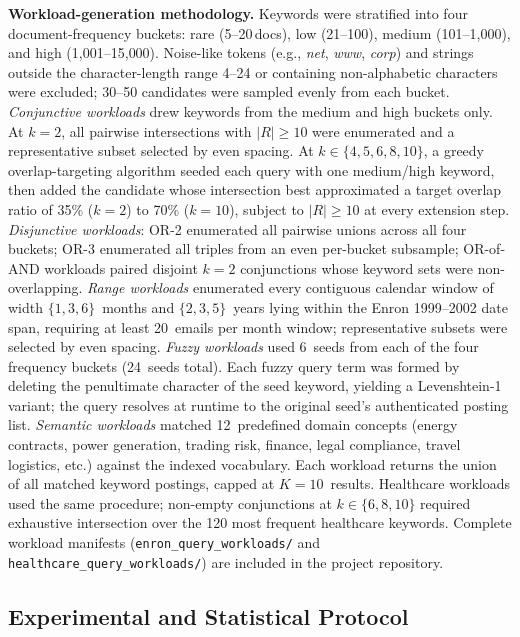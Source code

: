 \documentclass[journal]{IEEEtran}
\theoremstyle{tight}
\theoremstyle{remark}
\theoremstyle{plain}
\begin{document}
\textbf{Workload-generation methodology.}
Keywords were stratified into four document-frequency buckets: rare (5--20\,docs), low (21--100), medium (101--1{,}000), and high (1{,}001--15{,}000). Noise-like tokens (e.g., \textit{net}, \textit{www}, \textit{corp}) and strings outside the character-length range 4--24 or containing non-alphabetic characters were excluded; 30--50 candidates were sampled evenly from each bucket.
\textit{Conjunctive workloads} drew keywords from the medium and high buckets only.
At $k{=}2$, all pairwise intersections with $|R|\geq10$ were enumerated and a representative subset selected by even spacing.
At $k\in\{4,5,6,8,10\}$, a greedy overlap-targeting algorithm seeded each query with one medium/high keyword, then added the candidate whose intersection best approximated a target overlap ratio of 35\% ($k{=}2$) to 70\% ($k{=}10$), subject to $|R|\geq10$ at every extension step.
\textit{Disjunctive workloads}: OR-2 enumerated all pairwise unions across all four buckets; OR-3 enumerated all triples from an even per-bucket subsample; OR-of-AND workloads paired disjoint $k{=}2$ conjunctions whose keyword sets were non-overlapping.
\textit{Range workloads} enumerated every contiguous calendar window of width $\{1,3,6\}$~months and $\{2,3,5\}$~years lying within the Enron 1999--2002 date span, requiring at least 20~emails per month window; representative subsets were selected by even spacing.
\textit{Fuzzy workloads} used 6~seeds from each of the four frequency buckets (24~seeds total). Each fuzzy query term was formed by deleting the penultimate character of the seed keyword, yielding a Levenshtein-1 variant; the query resolves at runtime to the original seed's authenticated posting list.
\textit{Semantic workloads} matched 12~predefined domain concepts (energy contracts, power generation, trading risk, finance, legal compliance, travel logistics, etc.) against the indexed vocabulary. Each workload returns the union of all matched keyword postings, capped at $K{=}10$~results.
Healthcare workloads used the same procedure; non-empty conjunctions at $k\in\{6,8,10\}$ required exhaustive intersection over the 120 most frequent healthcare keywords. Complete workload manifests (\texttt{enron\_query\_workloads/} and \texttt{healthcare\_query\_workloads/}) are included in the project repository.

\subsection{Experimental and Statistical Protocol}
\label{4C}
\end{document}
